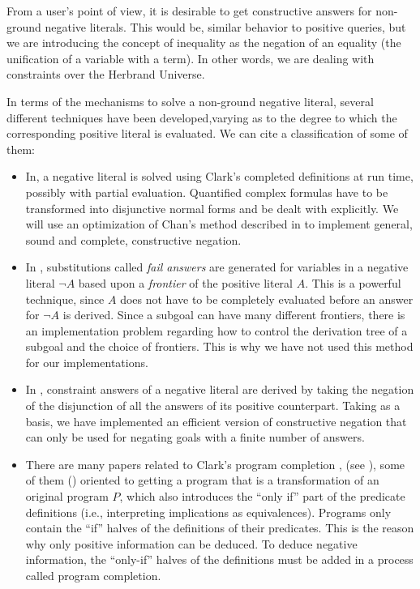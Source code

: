 \documentclass{tlp}
\begin{document}
From a user's point of view, it is desirable to get constructive
answers for non-ground negative literals. This would be, similar
behavior to positive queries, but we are introducing the concept of
inequality as the negation of an equality (the unification of a
variable with a term). In other words, we are dealing with
constraints over the Herbrand Universe.
 
In terms of the mechanisms to solve a non-ground negative literal,
several different techniques have been developed,varying as to the
degree to which the corresponding positive literal is evaluated. We
can cite a classification of some of them:
\begin{itemize}

\item In\cite{Chan2,Stuckey,Wallace}, a negative literal is solved
using Clark's completed definitions at run time, possibly with partial
evaluation. Quantified complex formulas have to be transformed into
disjunctive normal forms and be dealt with explicitly. We will use an
optimization of Chan's method described in \cite{Chan2} to implement
general, sound and complete, constructive negation.%

\item In \cite{Drabent,Fages,Malus}, substitutions called \emph{fail
answers} are generated for variables in a negative literal $\neg A$
based upon a \emph{frontier} of the positive literal $A$. This is a
powerful technique, since $A$ does not have to be completely evaluated
before an answer for $\neg A$ is derived. Since a subgoal can have
many different frontiers, there is an implementation problem regarding
how to control the derivation tree of a subgoal and the choice of
frontiers. This is why we have not used this method for our
implementations.

\item In \cite{Bossu,Chan1,Damasio,Khabaza,Przymusinski2},
constraint answers of a negative literal are derived by taking the
negation of the disjunction of all the answers of its positive
counterpart. Taking \cite{Chan1} as a basis, we have implemented an
efficient version of constructive negation that can only be used for
negating goals with a finite number of answers. %


\item There are many papers related to Clark's program completion
\cite{Clark}, (see \cite{Lloyd,Apt}), some of them
(\cite{Barbuti1,Barbuti2}) oriented to getting a program that is a
transformation of an original program $P$, which also introduces the
``only if'' part of the predicate definitions (i.e., interpreting
implications as equivalences). Programs only contain the ``if'' halves of
the definitions of their predicates. This is the reason why only
positive information can be deduced. To deduce negative
information, the ``only-if'' halves of the definitions must be added in
a process called program completion.

\end{itemize}
\end{document}
